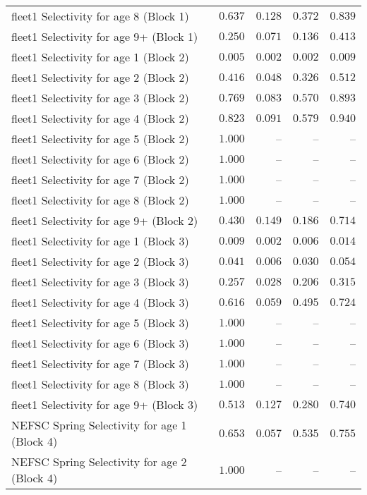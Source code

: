 \documentclass[
]{article}
\begin{document}
\begin{landscape}
\begin{longtable}[t]{lrrrr}
fleet1 Selectivity for age 8 (Block 1) & $0.637$ & $0.128$ & $0.372$ & $0.839$\\
\addlinespace
fleet1 Selectivity for age 9+ (Block 1) & $0.250$ & $0.071$ & $0.136$ & $0.413$\\
fleet1 Selectivity for age 1 (Block 2) & $0.005$ & $0.002$ & $0.002$ & $0.009$\\
fleet1 Selectivity for age 2 (Block 2) & $0.416$ & $0.048$ & $0.326$ & $0.512$\\
fleet1 Selectivity for age 3 (Block 2) & $0.769$ & $0.083$ & $0.570$ & $0.893$\\
fleet1 Selectivity for age 4 (Block 2) & $0.823$ & $0.091$ & $0.579$ & $0.940$\\
\addlinespace
fleet1 Selectivity for age 5 (Block 2) & $1.000$ & -- & -- & --\\
fleet1 Selectivity for age 6 (Block 2) & $1.000$ & -- & -- & --\\
fleet1 Selectivity for age 7 (Block 2) & $1.000$ & -- & -- & --\\
fleet1 Selectivity for age 8 (Block 2) & $1.000$ & -- & -- & --\\
fleet1 Selectivity for age 9+ (Block 2) & $0.430$ & $0.149$ & $0.186$ & $0.714$\\
\addlinespace
fleet1 Selectivity for age 1 (Block 3) & $0.009$ & $0.002$ & $0.006$ & $0.014$\\
fleet1 Selectivity for age 2 (Block 3) & $0.041$ & $0.006$ & $0.030$ & $0.054$\\
fleet1 Selectivity for age 3 (Block 3) & $0.257$ & $0.028$ & $0.206$ & $0.315$\\
fleet1 Selectivity for age 4 (Block 3) & $0.616$ & $0.059$ & $0.495$ & $0.724$\\
fleet1 Selectivity for age 5 (Block 3) & $1.000$ & -- & -- & --\\
\addlinespace
fleet1 Selectivity for age 6 (Block 3) & $1.000$ & -- & -- & --\\
fleet1 Selectivity for age 7 (Block 3) & $1.000$ & -- & -- & --\\
fleet1 Selectivity for age 8 (Block 3) & $1.000$ & -- & -- & --\\
fleet1 Selectivity for age 9+ (Block 3) & $0.513$ & $0.127$ & $0.280$ & $0.740$\\
NEFSC Spring Selectivity for age 1 (Block 4) & $0.653$ & $0.057$ & $0.535$ & $0.755$\\
\addlinespace
NEFSC Spring Selectivity for age 2 (Block 4) & $1.000$ & -- & -- & --\\

\end{longtable}
\end{landscape}
\end{document}
